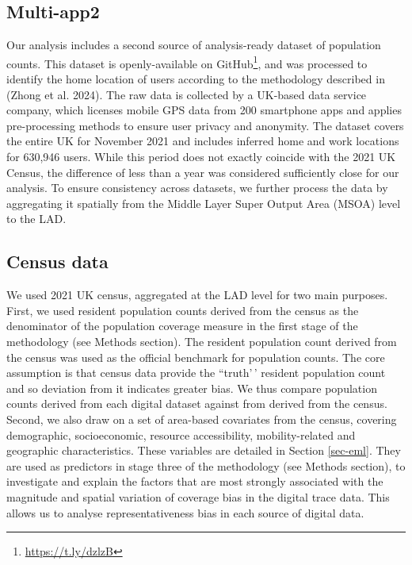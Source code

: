 \documentclass{article}
\begin{document}
\subsection{Multi-app2}\label{multi-app2}

Our analysis includes a second source of analysis-ready dataset of
population counts. This dataset is openly-available on GitHub\footnote{\url{https://t.ly/dzlzB}}, and was processed to
identify the home location of users according to the methodology
described in (Zhong et al. 2024). The raw data is collected by a UK-based
data service company, which licenses mobile GPS data from 200 smartphone
apps and applies pre-processing methods to ensure user privacy and
anonymity. The dataset covers the entire UK for November 2021 and
includes inferred home and work locations for 630,946 users. While this
period does not exactly coincide with the 2021 UK Census, the difference
of less than a year was considered sufficiently close for our analysis.
To ensure consistency across datasets, we further process the data by
aggregating it spatially from the Middle Layer Super Output Area (MSOA)
level to the LAD.

\subsection{Census data}\label{census-data}

We used 2021 UK census, aggregated at the LAD level for two main
purposes. First, we used resident population counts derived from the
census as the denominator of the population coverage measure in the
first stage of the methodology (see Methods section). The resident
population count derived from the census was used as the official
benchmark for population counts. The core assumption is that census data provide the ``truth'\,'
resident population count and so deviation from it indicates greater bias. We thus compare population
counts derived from each digital dataset against from derived from the census.
Second, we also draw on a set
of area-based covariates from the census, covering demographic,
socioeconomic, resource accessibility, mobility-related and geographic
characteristics. These variables are detailed in Section \ref{sec-eml}. They are used as predictors in stage three of the
methodology (see Methods section), to investigate and explain the
factors that are most strongly associated with the magnitude and spatial
variation of coverage bias in the digital trace data. This allows us to
analyse representativeness bias in each source of digital data.
\end{document}
